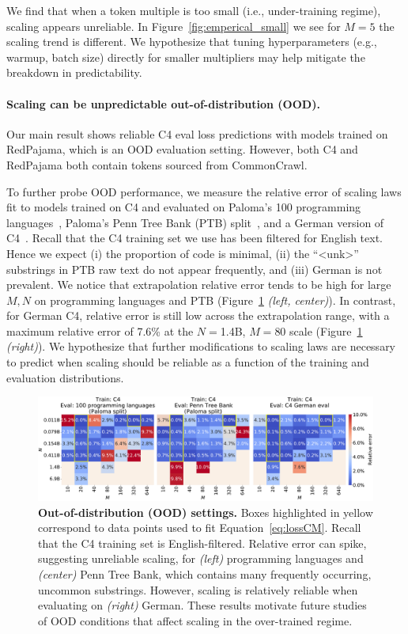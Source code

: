 \begin{appendix}
We find that when a token multiple is too small (i.e., under-training regime), scaling appears unreliable.
In Figure~\ref{fig:emperical_small} we see for $M=5$ the scaling trend is different.
We hypothesize that tuning hyperparameters (e.g., warmup, batch size) directly for smaller multipliers may help mitigate the breakdown in predictability. 

\paragraph{Scaling can be unpredictable out-of-distribution (OOD).}

Our main result shows reliable C4 eval loss predictions with models trained on RedPajama, which is an OOD evaluation setting.
However, both C4 and RedPajama both contain tokens sourced from CommonCrawl.

To further probe OOD performance, we measure the relative error of scaling laws fit to models trained on C4 and evaluated on Paloma's 100 programming languages~\cite{paloma}, Paloma's Penn Tree Bank (PTB) split~\cite{ptb}, and a German version of C4~\cite{c4_ai2}.
Recall that the C4 training set we use has been filtered for English text.
Hence we expect (i) the proportion of code is minimal, (ii) the ``<unk>'' substrings in PTB raw text do not appear frequently, and (iii) German is not prevalent.
We notice that extrapolation relative error tends to be high for large $M, N$ on programming languages and PTB (Figure~\ref{fig:error_ood} \emph{(left, center)}).
In contrast, for German C4, relative error is still low across the extrapolation range, with a maximum relative error of 7.6\% at the $N=$1.4B, $M=80$ scale (Figure~\ref{fig:error_ood} \emph{(right)}). 
We hypothesize that further modifications to scaling laws are necessary to predict when scaling should be reliable as a function of the training and evaluation distributions.

\begin{figure}[tp]
    \centering
    \includegraphics[width=\linewidth]{figs/error_ood.pdf}
    \caption{\textbf{Out-of-distribution (OOD) settings.} Boxes highlighted in yellow correspond to data points used to fit Equation~\eqref{eq:lossCM}.
    Recall that the C4 training set is English-filtered. Relative error can spike, suggesting unreliable scaling, for \emph{(left)} programming languages and \emph{(center)} Penn Tree Bank, which contains many frequently occurring, uncommon substrings.
    However, scaling is relatively reliable when evaluating on \emph{(right)} German.
    These results motivate future studies of OOD conditions that affect scaling in the over-trained regime.
    }
    \label{fig:error_ood}
\end{figure}



\end{appendix}

